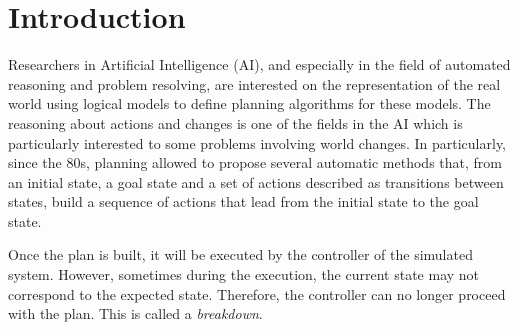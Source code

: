 
\chapter{Introduction} %

\label{Chapter 1} %



Researchers in Artificial Intelligence (AI), and especially in the field of automated reasoning and problem resolving, are interested on the representation of the real world using logical models to define planning algorithms for these models. The reasoning about actions and changes is one of the fields in the AI which is particularly interested to some problems involving world changes. In particularly, since the 80s, planning allowed to propose several automatic methods that, from an initial state, a goal state and a set of actions described as transitions between states, build a sequence of actions that lead from the initial state to the goal state.
\par Once the plan is built, it will be executed by the controller of the simulated system. However, sometimes during the execution, the current state may not correspond to the expected state. Therefore, the controller can no longer proceed with the plan. This is called a {\em breakdown}.

